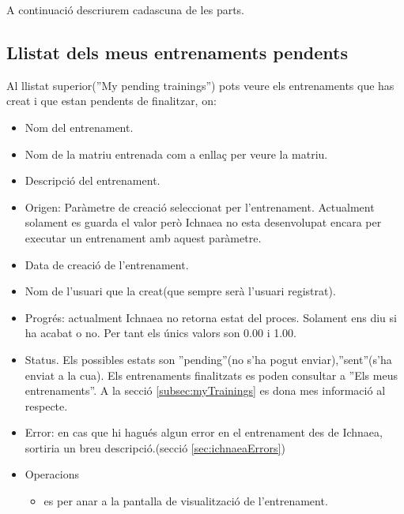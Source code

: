 A continuaci\'{o} descriurem cadascuna de les parts.

\subsection{Llistat dels meus entrenaments pendents}
Al llistat superior(''My pending trainings'') pots veure els entrenaments que has creat i que estan pendents de finalitzar, on: 
\begin{itemize}
\item Nom del entrenament.
\item Nom de la matriu entrenada com a enllaç per veure la matriu.
\item Descripci\'{o} del entrenament.
\item Origen: Paràmetre de creació seleccionat per l'entrenament. Actualment solament es guarda el valor però Ichnaea no esta desenvolupat encara per executar un entrenament amb aquest paràmetre.
\item Data de creaci\'{o} de l'entrenament.
\item Nom de l'usuari que la creat(que sempre serà l'usuari registrat).
\item Progr\'{e}s: actualment Ichnaea no retorna estat del proces. Solament ens diu si ha acabat o no. Per tant els \'{u}nics valors son 0.00 i 1.00.
\item Status. Els possibles estats son ''pending''(no s'ha pogut enviar),''sent''(s'ha enviat a la cua). Els entrenaments finalitzats es poden consultar a ''Els meus entrenaments''. A la secció \ref{subsec:myTrainings} es dona mes informació al respecte.
\item Error: en cas que hi hagués algun error en el entrenament des de Ichnaea, sortiria un breu descripció.(secció  \ref{sec:ichnaeaErrors})
\item Operacions
 \begin{itemize}
 \item \iconeyeopen es per anar a la pantalla de visualització de l'entrenament.
 \end{itemize}
\end{itemize}

